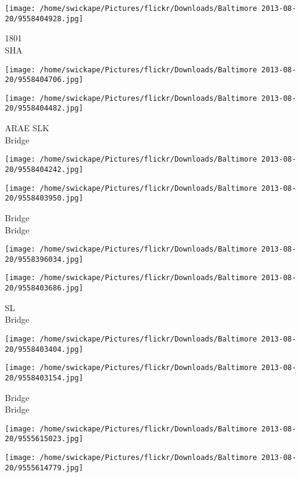\documentclass[10pt,letterpaper]{article}
\begin{document}
\vspace{0.25in}
\texttt{[image: /home/swickape/Pictures/flickr/Downloads/Baltimore 2013-08-20/9558404928.jpg]}

1801\\
SHA\\
\pagebreak

\texttt{[image: /home/swickape/Pictures/flickr/Downloads/Baltimore 2013-08-20/9558404706.jpg]}

\vspace{0.25in}
\texttt{[image: /home/swickape/Pictures/flickr/Downloads/Baltimore 2013-08-20/9558404482.jpg]}

ARAE SLK\\
Bridge\\
\pagebreak

\texttt{[image: /home/swickape/Pictures/flickr/Downloads/Baltimore 2013-08-20/9558404242.jpg]}

\vspace{0.25in}
\texttt{[image: /home/swickape/Pictures/flickr/Downloads/Baltimore 2013-08-20/9558403950.jpg]}

Bridge\\
Bridge\\
\pagebreak

\texttt{[image: /home/swickape/Pictures/flickr/Downloads/Baltimore 2013-08-20/9558396034.jpg]}

\vspace{0.25in}
\texttt{[image: /home/swickape/Pictures/flickr/Downloads/Baltimore 2013-08-20/9558403686.jpg]}

SL\\
Bridge\\
\pagebreak

\texttt{[image: /home/swickape/Pictures/flickr/Downloads/Baltimore 2013-08-20/9558403404.jpg]}

\vspace{0.25in}
\texttt{[image: /home/swickape/Pictures/flickr/Downloads/Baltimore 2013-08-20/9558403154.jpg]}

Bridge\\
Bridge\\
\pagebreak

\texttt{[image: /home/swickape/Pictures/flickr/Downloads/Baltimore 2013-08-20/9555615023.jpg]}

\vspace{0.25in}
\texttt{[image: /home/swickape/Pictures/flickr/Downloads/Baltimore 2013-08-20/9555614779.jpg]}
\end{document}
